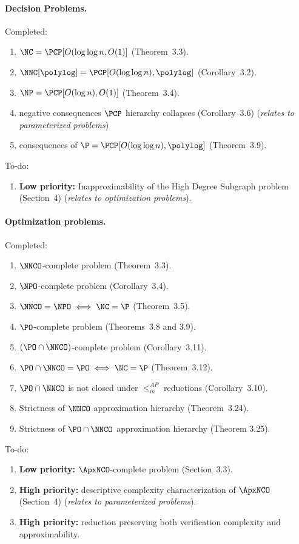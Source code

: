 \paragraph{Decision Problems.}
Completed:
\begin{enumerate}
\item $\NC = \PCP[O(\log \log n, O(1)]$ (Theorem~3.3).
\item $\NNC[\polylog] = \PCP[O(\log \log n), \polylog]$ (Corollary~3.2).
\item $\NP = \PCP[O(\log n), O(1)]$ (Theorem~3.4).
\item negative consequences $\PCP$ hierarchy collapses (Corollary~3.6) (\emph{relates to parameterized problems})
\item consequences of $\P = \PCP[O(\log \log n), \polylog]$ (Theorem~3.9).
\end{enumerate}
To-do:
\begin{enumerate}
\item \textbf{Low priority:} Inapproximability of the High Degree Subgraph problem (Section~4) (\emph{relates to optimization problems}).
\end{enumerate}

\paragraph{Optimization problems.}

Completed:
\begin{enumerate}
\item $\NNCO$-complete problem (Theorem~3.3).
\item $\NPO$-complete problem (Corollary~3.4).
\item $\NNCO = \NPO \iff \NC = \P$ (Theorem~3.5).

\item $\PO$-complete problem (Theorems~3.8 and 3.9).
\item $(\PO \cap \NNCO)$-complete problem (Corollary~3.11).
\item $\PO \cap \NNCO = \PO \iff \NC = \P$ (Theorem~3.12).

\item $\PO \cap \NNCO$ is not closed under $\leq_m^{AP}$ reductions (Corollary~3.10).

\item Strictness of $\NNCO$ approximation hierarchy (Theorem~3.24).
\item Strictness of $\PO \cap \NNCO$ approximation hierarchy (Theorem 3.25).
\end{enumerate}
To-do:
\begin{enumerate}
\item \textbf{Low priority:} $\ApxNCO$-complete problem (Section~3.3).
\item \textbf{High priority:} descriptive complexity characterization of $\ApxNCO$ (Section~4) (\emph{relates to parameterized problems}).
\item \textbf{High priority:} reduction preserving both verification complexity and approximability.
\end{enumerate}

